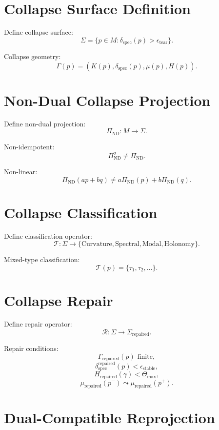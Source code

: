 \documentclass[11pt]{article}
\begin{document}
\section{Collapse Surface Definition}

Define collapse surface:
\[
\Sigma = \{ p \in M : \delta_{\mathrm{spec}}(p) > \epsilon_{\mathrm{tear}} \}.
\]

Collapse geometry:
\[
\Gamma(p) = (K(p), \delta_{\mathrm{spec}}(p), \mu(p), H(p)).
\]

\section{Non-Dual Collapse Projection}

Define non-dual projection:
\[
\Pi_{\mathrm{ND}} : M \to \Sigma.
\]

Non-idempotent:
\[
\Pi_{\mathrm{ND}}^2 \neq \Pi_{\mathrm{ND}}.
\]

Non-linear:
\[
\Pi_{\mathrm{ND}}(a p + b q)
  \neq a \Pi_{\mathrm{ND}}(p) + b \Pi_{\mathrm{ND}}(q).
\]

\section{Collapse Classification}

Define classification operator:
\[
\mathcal{T} : \Sigma \to \{\text{Curvature}, \text{Spectral}, \text{Modal}, \text{Holonomy}\}.
\]

Mixed-type classification:
\[
\mathcal{T}(p) = \{\tau_1, \tau_2, \dots\}.
\]

\section{Collapse Repair}

Define repair operator:
\[
\mathcal{R} : \Sigma \to \Sigma_{\mathrm{repaired}}.
\]

Repair conditions:
\[
\Gamma_{\mathrm{repaired}}(p) \text{ finite},
\]
\[
\delta_{\mathrm{spec}}^{\mathrm{repaired}}(p) < \epsilon_{\mathrm{stable}},
\]
\[
H_{\mathrm{repaired}}(\gamma) < \Theta_{\max},
\]
\[
\mu_{\mathrm{repaired}}(p^-) \leadsto \mu_{\mathrm{repaired}}(p^+).
\]

\section{Dual-Compatible Reprojection}
\end{document}
